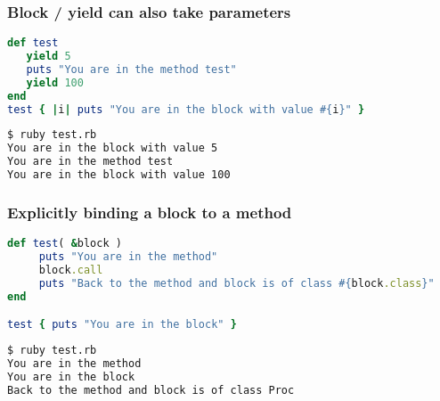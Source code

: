 \begin{frame}[fragile]\frametitle{Block / yield can also take parameters}

\begin{lstlisting}[language=ruby]
def test
   yield 5
   puts "You are in the method test"
   yield 100
end
test { |i| puts "You are in the block with value #{i}" }
\end{lstlisting}
\pause

\begin{lstlisting}[language=bash]
$ ruby test.rb 
You are in the block with value 5
You are in the method test
You are in the block with value 100
\end{lstlisting}

\end{frame}


\begin{frame}[fragile]\frametitle{Explicitly binding a block to a method}


\begin{lstlisting}[language=ruby]
def test( &block )                                                                                                                                                                                                                            
     puts "You are in the method"
     block.call
     puts "Back to the method and block is of class #{block.class}"
end

test { puts "You are in the block" }
\end{lstlisting}
\pause

\begin{lstlisting}[language=bash]
$ ruby test.rb 
You are in the method
You are in the block
Back to the method and block is of class Proc
\end{lstlisting}


\end{frame}



